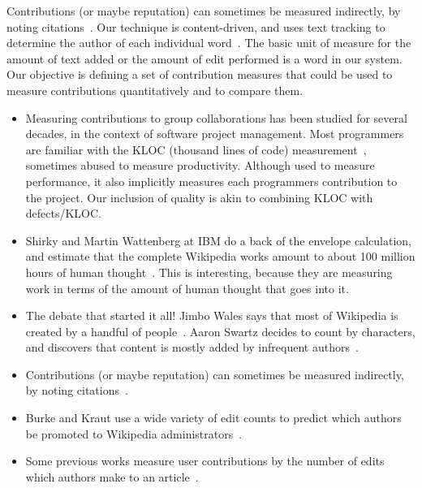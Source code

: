Contributions (or maybe reputation) can sometimes be measured 
indirectly, by noting 
citations~\cite{Page1999,Giles2004,WikiMTWtrust06}.
Our technique is content-driven, and uses text tracking
to determine the author of each individual 
word~\cite{RankingControversies2008,Adler2007}.
The basic unit of measure for the amount of text added or the
amount of edit performed is a word in our system.
Our objective is defining a set of contribution measures
that could be used to measure contributions quantitatively
and to compare them.

\begin{itemize}

\item Measuring contributions to group collaborations has been
	studied for several decades, in the context of
	software project management.
	Most programmers are familiar with the KLOC
	(thousand lines of code) measurement~\cite{Schultz1988,Park1992},
	sometimes abused to measure productivity.
	Although used to measure performance, it also
	implicitly measures each programmers contribution
	to the project. 
    Our inclusion of quality is akin
	to combining KLOC with defects/KLOC.

\item Shirky and Martin Wattenberg at IBM do a back of the
        envelope calculation, and estimate that the complete Wikipedia
	works amount to about 100 million hours of human
	thought~\cite{Shirky2008}.
	This is interesting, because they are measuring work
	in terms of the amount of human thought that goes into it.

\item The debate that started it all!
	Jimbo Wales says that most of Wikipedia is created by
	a handful of people~\cite{Wales2005}.
	Aaron Swartz decides to count by characters,
	and discovers that content is mostly added
	by infrequent authors~\cite{Swartz2006}.

\item Contributions (or maybe reputation) can sometimes be measured indirectly,
	by noting citations~\cite{Page1999,Giles2004,WikiMTWtrust06}.

\item Burke and Kraut use a wide variety of edit counts to predict
	which authors be promoted to Wikipedia administrators~\cite{AdministratorMop2008}.

\item Some previous works measure user contributions by the number
	of edits which authors make to an
	article~\cite{Wales2005,EditsEqQuality2007,Kittur2007,
	Suh2008,OrtegaBarahona2007,Stein2007}.


\end{itemize}
